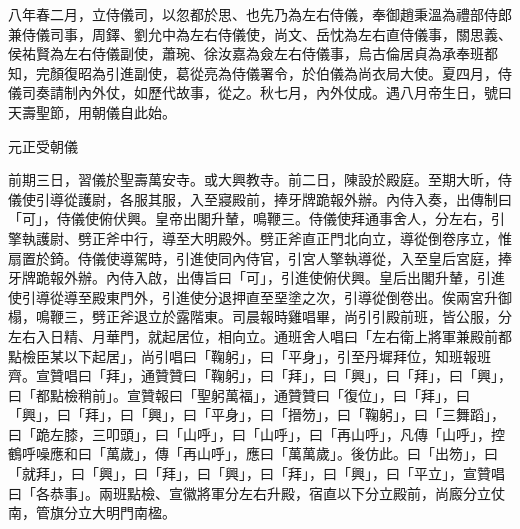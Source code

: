 \begin{pinyinscope}
 八年春二月，立侍儀司，以忽都於思、也先乃為左右侍儀，奉御趙秉溫為禮部侍郎兼侍儀司事，周鐸、劉允中為左右侍儀使，尚文、岳忱為左右直侍儀事，關思義、侯祐賢為左右侍儀副使，蕭琬、徐汝嘉為僉左右侍儀事，烏古倫居貞為承奉班都知，完顏復昭為引進副使，葛從亮為侍儀署令，於伯儀為尚衣局大使。夏四月，侍儀司奏請制內外仗，如歷代故事，從之。秋七月，內外仗成。遇八月帝生日，號曰天壽聖節，用朝儀自此始。



 元正受朝儀



 前期三日，習儀於聖壽萬安寺。或大興教寺。前二日，陳設於殿庭。至期大昕，侍儀使引導從護尉，各服其服，入至寢殿前，捧牙牌跪報外辦。內侍入奏，出傳制曰「可」，侍儀使俯伏興。皇帝出閣升輦，鳴鞭三。侍儀使拜通事舍人，分左右，引擎執護尉、劈正斧中行，導至大明殿外。劈正斧直正門北向立，導從倒卷序立，惟扇置於錡。侍儀使導駕時，引進使同內侍官，引宮人擎執導從，入至皇后宮庭，捧牙牌跪報外辦。內侍入啟，出傳旨曰「可」，引進使俯伏興。皇后出閣升輦，引進使引導從導至殿東門外，引進使分退押直至堊塗之次，引導從倒卷出。俟兩宮升御榻，鳴鞭三，劈正斧退立於露階東。司晨報時雞唱畢，尚引引殿前班，皆公服，分左右入日精、月華門，就起居位，相向立。通班舍人唱曰「左右衛上將軍兼殿前都點檢臣某以下起居」，尚引唱曰「鞠躬」，曰「平身」，引至丹墀拜位，知班報班齊。宣贊唱曰「拜」，通贊贊曰「鞠躬」，曰「拜」，曰「興」，曰「拜」，曰「興」，曰「都點檢稍前」。宣贊報曰「聖躬萬福」，通贊贊曰「復位」，曰「拜」，曰「興」，曰「拜」，曰「興」，曰「平身」，曰「搢笏」，曰「鞠躬」，曰「三舞蹈」，曰「跪左膝，三叩頭」，曰「山呼」，曰「山呼」，曰「再山呼」，凡傳「山呼」，控鶴呼噪應和曰「萬歲」，傳「再山呼」，應曰「萬萬歲」。後仿此。曰「出笏」，曰「就拜」，曰「興」，曰「拜」，曰「興」，曰「拜」，曰「興」，曰「平立」，宣贊唱曰「各恭事」。兩班點檢、宣徽將軍分左右升殿，宿直以下分立殿前，尚廄分立仗南，管旗分立大明門南楹。




\end{pinyinscope}
